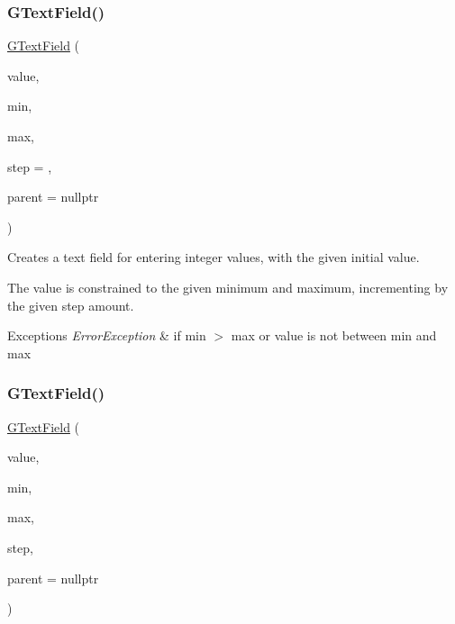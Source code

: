 \subsubsection{\texorpdfstring{G\+Text\+Field()}{GTextField()}\hspace{0.1cm}{\footnotesize\ttfamily [3/4]}}
{\footnotesize\ttfamily \mbox{\hyperlink{classsgl_1_1GTextField}{G\+Text\+Field}} (\begin{DoxyParamCaption}\item[{int}]{value,  }\item[{int}]{min,  }\item[{int}]{max,  }\item[{int}]{step = {},  }\item[{Q\+Widget $\ast$}]{parent = {\ttfamily nullptr} }\end{DoxyParamCaption})}



Creates a text field for entering integer values, with the given initial value. 

The value is constrained to the given minimum and maximum, incrementing by the given step amount. 
\begin{DoxyExceptions}{Exceptions}
{\em Error\+Exception} & if min $>$ max or value is not between min and max \\
\hline
\end{DoxyExceptions}
\mbox{\label{classsgl_1_1GTextField_a8d164bf18d4dd4da6d5af0d23ee3a2c8}} 
\subsubsection{\texorpdfstring{G\+Text\+Field()}{GTextField()}\hspace{0.1cm}{\footnotesize\ttfamily [4/4]}}
{\footnotesize\ttfamily \mbox{\hyperlink{classsgl_1_1GTextField}{G\+Text\+Field}} (\begin{DoxyParamCaption}\item[{double}]{value,  }\item[{double}]{min,  }\item[{double}]{max,  }\item[{double}]{step,  }\item[{Q\+Widget $\ast$}]{parent = {\ttfamily nullptr} }\end{DoxyParamCaption})}



